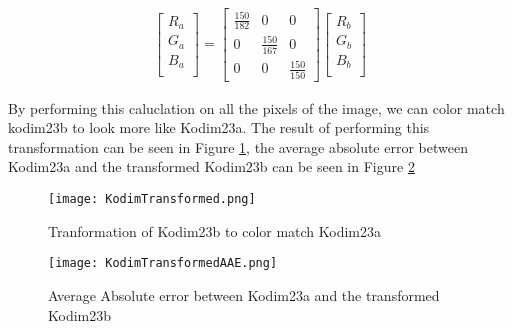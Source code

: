 \begin{gather}
    \begin{bmatrix}
        R_a \\
        G_a \\
        B_a \\       
    \end{bmatrix}
    =
    \begin{bmatrix}
        \frac{150}{182} & 0 & 0 \\
        0 & \frac{150}{167} & 0 \\
        0 & 0 & \frac{150}{150}
    \end{bmatrix}
    \begin{bmatrix}
        R_b \\
        G_b \\
        B_b \\
    \end{bmatrix}
\end{gather}

By performing this caluclation on all the pixels of the image, we can color match kodim23b to look more like Kodim23a. The result of performing this transformation can be seen in Figure \ref{fig:KodimTransform}, the average absolute error between Kodim23a and the transformed Kodim23b can be seen in Figure \ref{fig:KodimAAE}

\begin{figure}[!h]
    \texttt{[image: KodimTransformed.png]}
    \centering
    \caption{Tranformation of Kodim23b to color match Kodim23a}
    \label{fig:KodimTransform}
\end{figure}

\begin{figure}[!h]
    \texttt{[image: KodimTransformedAAE.png]}
    \centering
    \caption{Average Absolute error between Kodim23a and the transformed Kodim23b}
    \label{fig:KodimAAE}
\end{figure}
